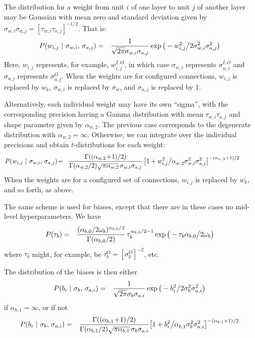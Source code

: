 \documentclass{report}[11pt]
\def\beq{\begin{eqnarray}}
\def\eeq{\end{eqnarray}}
\def\eep{\end{eqnarray}}
\begin{document}
The distribution for a weight from unit $i$ of one layer to unit $j$ of
another layer may be Gaussian with mean zero and standard deviation given 
by $\sigma_{w,i}\sigma_{a,j} = [\tau_{w,i}\tau_{a,j}]^{-1/2}$. That is:\beq
  P(w_{i,j}\ |\ \sigma_{w,i},\,\sigma_{a,j}) & = &
    {1 \over \sqrt{2\pi} \sigma_{w,i}\sigma_{a,j}} 
    \exp \big( - w_{i,j}^2 \big/ 2\sigma_{w,i}^2\sigma_{a,j}^2 \big)
\label{priorwg}\eeq%
Here, $w_{i,j}$ represents, for example, $w^{I,O}_{i,j}$, in which case
$\sigma_{w,i}$ represents $\sigma^{I,O}_{w,i}$ and $\sigma_{a,j}$ represents
$\sigma^O_{a,j}$.  When the weights are for configured connections, $w_{i,j}$
is replaced by $w_k$, $\sigma_{w,i}$ is replaced by $\sigma_w$, and
$\sigma_{a,j}$ is replaced by 1.

Alternatively, each individual weight may have its own ``sigma'', with
the corresponding precision having a Gamma distribution with mean
$\tau_{w,i}\tau_{a,j}$ and shape parameter given by $\alpha_{w,2}$.  The
previous case corresponds to the degenerate distribution with
$\alpha_{w,2} = \infty$.  Otherwise, we can integrate over the individual
precisions and obtain $t$-distributions for each weight:\beq
  P(w_{i,j}\ |\ \sigma_{w,i},\,\sigma_{a,j}) & \!=\! &
    {\Gamma((\alpha_{w,2}\!+\!1)/2) \over 
     \Gamma(\alpha_{w,2}/2) \sqrt{\pi\alpha_{w,2}}\, \sigma_{w,i}\sigma_{a,j}}\,
     \big[ 1 + w_{i,j}^2 \big/ \alpha_{w,2}^{\ }\sigma_{w,i}^2\sigma_{a,j}^2 
     \big]^{ -(\alpha_{w,2}+1)/2}\ \ \ \ \ \ \
\label{priorwt}\eeq
When the weights are for a configured set of connections, $w_{i,j}$ is
replaced by $w_k$, and so forth, as above.

The same scheme is used for biases, except that there are in
these cases no mid-level hyperparameters.  We have \beq
  P(\tau_b)
   & = & {(\alpha_{b,0}/2\omega_b)^{\alpha_{b,0}/2} 
          \over \Gamma(\alpha_{b,0}/2)}\,
         \tau_b^{\alpha_{b,0}/2-1}
         \exp \big(-\tau_b \alpha_{b,0} \big/ 2 \omega_b \big) 
\eeq%
where $\tau_b$ might, for example, be $\tau^{O}_b = [\sigma^{O}_b]^{-2}$, etc.

The distribution of the biases is then either\beq
  P(b_i\ |\ \sigma_b,\,\sigma_{a,i}) & = &
    {1 \over \sqrt{2\pi} \sigma_b\sigma_{a,i}} 
    \exp \big( - b_i^2 \big/ 2\sigma_b^2\sigma_{a,i}^2 \big)
\label{priorbg}\eeq%
if $\alpha_{b,1}=\infty$, or if not\beq
  P(b_i\ |\ \sigma_b,\,\sigma_{a,i}) & = &
    {\Gamma((\alpha_{b,1}\!+\!1)/2) \over 
     \Gamma(\alpha_{b,1}/2) \sqrt{\pi\alpha_{b,1}}\, \sigma_b \sigma_{a,i}}
     \big[ 1 + b_i^2 \big/ \alpha_{b,1}^{\ }\sigma_b^2\sigma_{a,i}^2 
     \big]^{-(\alpha_{b,1}+1)/2}
\label{priorbt}\eep
\end{document}
